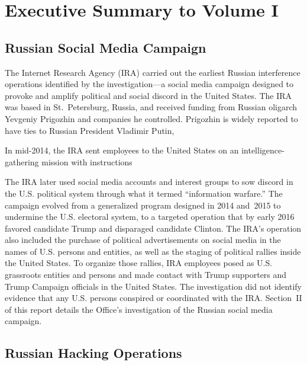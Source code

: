 \section*{Executive Summary to Volume I}
\label{sec:executive-1}

\subsection*{Russian Social Media Campaign}

The Internet Research Agency (IRA) carried out the earliest Russian interference operations identified by the investigation---a social media campaign designed to provoke and amplify political and social discord in the United States.
The IRA was based in St.~Petersburg, Russia, and received funding from Russian oligarch Yevgeniy Prigozhin and companies he controlled.
Prigozhin is widely reported to have ties to Russian President Vladimir Putin, 

In mid-2014, the IRA sent employees to the United States on an intelligence-gathering mission with instructions 

The IRA later used social media accounts and interest groups to sow discord in the U.S. political system through what it termed ``information warfare.''
The campaign evolved from a generalized program designed in 2014 and~2015 to undermine the U.S. electoral system, to a targeted operation that by early 2016 favored candidate Trump and disparaged candidate Clinton.
The IRA's operation also included the purchase of political advertisements on social media in the names of U.S. persons and entities, as well as the staging of political rallies inside the United States.
To organize those rallies, IRA employees posed as U.S. grassroots entities and persons and made contact with Trump supporters and Trump Campaign officials in the United States.
The investigation did not identify evidence that any U.S. persons conspired or coordinated with the IRA\null.
Section~II of this report details the Office's investigation of the Russian social media campaign.

\subsection*{Russian Hacking Operations}


